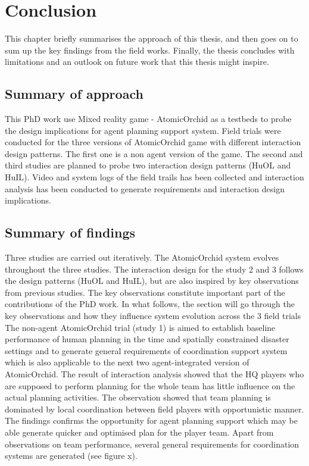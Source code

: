 \chapter{Conclusion}

This chapter briefly summarises the approach of this thesis, and then goes on to sum up the key findings from the field works. Finally, the thesis concludes with limitations and an outlook on future work that this thesis might inspire.\\

\section{Summary of approach}
This PhD work use Mixed reality game - AtomicOrchid as a testbeds to probe the design implications for agent planning support system. Field trials were conducted for the three versions of AtomicOrchid game with different interaction design patterns. The first one is a non agent version of the game. The second and third studies are planned to probe two interaction design patterns (HuOL and HuIL). Video and system logs of the field trails has been collected and interaction analysis has been conducted to generate requirements and interaction design implications. \\


\section{Summary of findings}
Three studies are carried out iteratively. The AtomicOrchid system evolves throughout the three studies. The interaction design for the study 2 and 3 follows the design patterns (HuOL and HuIL), but are also inspired by key observations from previous studies. The key observations constitute important part of the contributions of the PhD work. In what follows, the section will go through the key observations and how they influence system evolution across the 3 field trials \\ 


The non-agent AtomicOrchid trial (study 1) is aimed to establish baseline performance of human planning in the time and spatially constrained disaster settings and to generate general requirements of coordination support system which is also applicable to the next two agent-integrated version of AtomicOrchid. The result of interaction analysis showed that the HQ players who are supposed to perform planning for the whole team has little influence on the actual planning activities. The observation showed that team planning is dominated by local coordination between field players with opportunistic manner. The findings confirms the opportunity for agent planning support which may be able generate quicker and optimised plan for the player team. Apart from observations on team performance, several general requirements for coordination systems are generated (see figure x).\\

